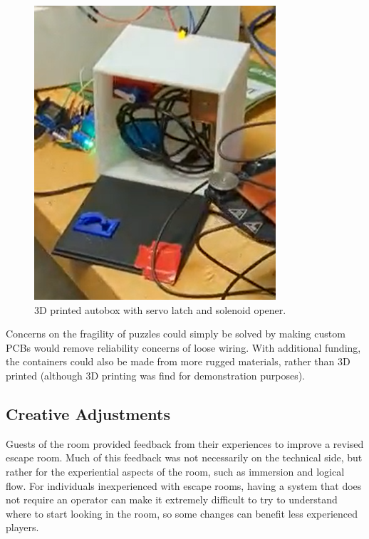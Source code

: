 \documentclass[conference]{IEEEtran}
\begin{document}
\begin{figure}[ht]
    \centering
    \includegraphics[width=0.90\columnwidth]{Images/autobox_low_res.png}
    \caption{3D printed autobox with servo latch and solenoid opener.}
    \label{fig:pir}
\end{figure}

\indent Concerns on the fragility of puzzles could simply be solved by making custom PCBs would remove reliability concerns 
of loose wiring. With additional funding, the containers could also be made from more rugged materials, rather than 3D 
printed (although 3D printing was find for demonstration purposes).

\subsection{Creative Adjustments}
Guests of the room provided feedback from their experiences to improve a revised escape room. Much of this feedback was 
not necessarily on the technical side, but rather for the experiential aspects of the room, such as immersion and logical 
flow. For individuals inexperienced with escape rooms, having a system that does not require an operator can make it extremely 
difficult to try to understand where to start looking in the room, so some changes can benefit less experienced players.
\end{document}
